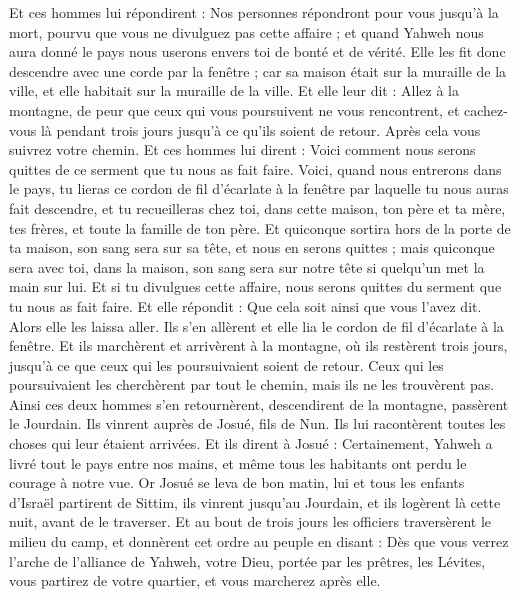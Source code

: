 \begin{multicols}{2}
Et ces hommes lui répondirent : Nos personnes répondront pour vous jusqu'à la mort, pourvu que vous ne divulguez pas cette affaire ; et quand Yahweh nous aura donné le pays nous userons envers toi de bonté et de vérité. 
Elle les fit donc descendre avec une corde par la fenêtre ; car sa maison était sur la muraille de la ville, et elle habitait sur la muraille de la ville. 
Et elle leur dit : Allez à la montagne, de peur que ceux qui vous poursuivent ne vous rencontrent, et cachez-vous là pendant trois jours jusqu'à ce qu'ils soient de retour. Après cela vous suivrez votre chemin.
Et ces hommes lui dirent : Voici comment nous serons quittes de ce serment que tu nous as fait faire.
Voici, quand nous entrerons dans le pays, tu lieras ce cordon de fil d'écarlate à la fenêtre par laquelle tu nous auras fait descendre, et tu recueilleras chez toi, dans cette maison, ton père et ta mère, tes frères, et toute la famille de ton père.
Et quiconque sortira hors de la porte de ta maison, son sang sera sur sa tête, et nous en serons quittes ; mais quiconque sera avec toi, dans la maison, son sang sera sur notre tête si quelqu'un met la main sur lui.
Et si tu divulgues cette affaire, nous serons quittes du serment que tu nous as fait faire.
Et elle répondit : Que cela soit ainsi que vous l'avez dit. Alors elle les laissa aller. Ils s'en allèrent et elle lia le cordon de fil d'écarlate à la fenêtre.
Et ils marchèrent et arrivèrent à la montagne, où ils restèrent trois jours, jusqu'à ce que ceux qui les poursuivaient soient de retour. Ceux qui les poursuivaient les cherchèrent par tout le chemin, mais ils ne les trouvèrent pas.
Ainsi ces deux hommes s'en retournèrent, descendirent de la montagne, passèrent le Jourdain. Ils vinrent auprès de Josué, fils de Nun. Ils lui racontèrent toutes les choses qui leur étaient arrivées.
Et ils dirent à Josué : Certainement, Yahweh a livré tout le pays entre nos mains, et même tous les habitants ont perdu le courage à notre vue.
\VerseOne{}Or Josué se leva de bon matin, lui et tous les enfants d'Israël partirent de Sittim, ils vinrent jusqu'au Jourdain, et ils logèrent là cette nuit, avant de le traverser.
Et au bout de trois jours les officiers traversèrent le milieu du camp,
et donnèrent cet ordre au peuple en disant : Dès que vous verrez l'arche de l'alliance de Yahweh, votre Dieu, portée par les prêtres, les Lévites, vous partirez de votre quartier, et vous marcherez après elle.

\end{multicols}
